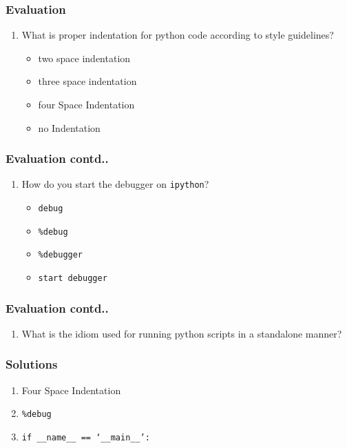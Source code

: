\documentclass[17pt,compress]{beamer}
\newcounter{saveenumi}
\newcommand{\seti}{\setcounter{saveenumi}{\value{enumi}}}
\newcommand{\conti}{\setcounter{enumi}{\value{saveenumi}}}
\begin{document}
\begin{frame}
\frametitle{Evaluation}
\label{sec-18.1}

\begin{enumerate}
\item What is proper indentation for python code according to style guidelines?
	\begin{itemize}
	\item two space indentation
	\item three space indentation
	\item four Space Indentation
	\item no Indentation
\end{itemize}
\seti
\end{enumerate}
\end{frame}
\begin{frame}
\frametitle{Evaluation contd..}
\label{sec-18.2}

\begin{enumerate}
\conti
\item How do you start the debugger on \texttt{ipython}?
	\begin{itemize}
	\item \texttt{debug}
	\item \texttt{\%debug}
	\item \texttt{\%debugger}
	\item \texttt{start debugger}
	\end{itemize}
\seti
\end{enumerate}
\end{frame}
\begin{frame}
\frametitle{Evaluation contd..}
\label{sec-18.3}

\begin{enumerate}
\conti
\item What is the idiom used for running python scripts in a standalone manner?
\end{enumerate}
\end{frame}
\begin{frame}
\frametitle{Solutions}
\label{sec-19}

\begin{enumerate}
\item Four Space Indentation\pause
\vspace{12pt}
\item \texttt{\%debug}\pause
\vspace{12pt}
\item \texttt{if \_\_name\_\_ == `\_\_main\_\_':}
\end{enumerate}
\end{frame}
\end{document}
